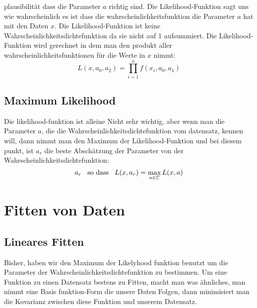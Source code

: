 \documentclass{article}
\newcommand{\smspc}{\hspace{0.3cm}}
\begin{document}
plausibilität dass die Parameter $a$ richtig sind. Die Likelihood-Funktion sagt uns wie wahrscheinlich es ist dass die wahrscheinlichkeitsfunktion die Parameter $a$ hat mit den Daten $x$. Die Likelihood-Funktion ist keine Wahrscheinlichkeitsdichtefunktion da sie nicht auf $1$ aufsummiert.
\newline Die Likelihood-Funktion wird gerechnet in dem man den produkt aller wahrscheinlichkeitsfunktionen für die Werte in $x$ nimmt:
\[L(x,a_0,a_2)=\prod_{i=1}^nf(x_i, a_0, a_1)\]
\hypertarget{maxlikelihood}{\subsection*{Maximum Likelihood}}Die likelihood-funktion ist alleine Nicht sehr wichtig, aber wenn man die Parameter $a$, die die Wahrscheinlichkeitsdichtefunktion vom datensatz, kennen will, dann nimmt man den Maximum der Likelihood-Funktion und bei diesem punkt, ist $a_r$ die beste Abschätzung der Parameter von der Wahrscheinlichkeitsdichtefunktion: \[a_r \smspc \text{so dass} \smspc L(x,a_r)=\max_{a\in \mathbb{C}}L(x,a)\]
\section*{Fitten von Daten}
\hypertarget{linearfitten}{\subsection*{Lineares Fitten}}
Bisher, haben wir den Maximum der Likelyhood funktion benutzt um die Parameter der Wahrscheinlichkeitsdichtefunktion zu bestimmen. Um eine Funktion zu einen Datensatz bestens zu Fitten, macht man was ähnliches, man nimmt eine Basis funktion-Form die unsere Daten Folgen, dann minimisiert man die Kovarianz zwischen diese Funktion und unserem Datensatz.
\end{document}
